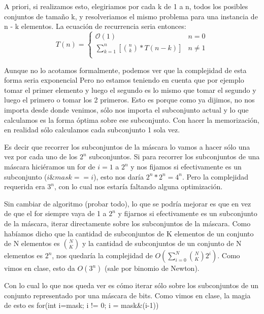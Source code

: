 A priori, si realizamos esto, elegiriamos por cada k de 1 a n, todos los posibles conjuntos de tamaño k, y resolveriamos el mismo problema para una instancia de n - k elementos.
La ecuación de recurrencia seria entonces:
\[ T(n) =  \begin{cases} 
      \mathcal{O}(1) & n = 0 \\
      \sum_{k=1}^{n} [ {n \choose k} * T(n - k)] & n \neq 1 \\ 
   \end{cases}
 \]

Aunque no lo acotamos formalmente, podemos ver que la complejidad de esta forma seria exponencial
Pero no estamos teniendo en cuenta que por ejemplo tomar el primer elemento y luego el segundo es lo mismo que tomar el segundo y luego el primero o tomar los 2 primeros. Esto es porque como ya dijimos, no nos importa desde donde venimos, sólo nos importa el subconjunto actual y lo que calculamos es la forma óptima sobre ese subconjunto. Con hacer la memorización, en realidad sólo calculamos cada subconjunto 1 sola vez. \newline


Es decir que recorrer los subconjuntos de la máscara lo vamos a hacer sólo una vez por cada uno de los $2^{n}$ subconjuntos. Si para recorrer los subconjuntos de una máscara hiciéramos un for de $i = 1$ a $2^{n}$ y nos fijamos si efectivamente es un subconjunto ($i \& mask == i$), esto nos daría $2^{n} * 2^{n} = 4^{n}$. Pero la complejidad requerida era $3^{n}$, con lo cual nos estaría faltando alguna optimización. \newline


Sin cambiar de algoritmo (probar todo), lo que se podría mejorar es que en vez de que el for siempre vaya de 1 a $2^{n}$ y fijarnos si efectivamente es un subconjunto de la máscara, iterar directamente sobre los subconjuntos de la máscara. Como habíamos dicho que la cantidad de subconjuntos de K elementos de un conjunto de N elementos es $\binom{N}{K}$ y la cantidad de subconjuntos de un conjunto de N elementos es $2^{n}$, nos quedaría la complejidad de $O(\sum_{i=0}^{N} \binom{N}{K} 2^{i} )$. Como vimos en clase, esto da $O(3^{n})$ (sale por binomio de Newton). \newline

Con lo cual lo que nos queda ver es cómo iterar sólo sobre los subconjuntos de un conjunto representado por una máscara de bits. Como vimos en clase, la magia de esto es  \newline for(int i=mask; i != 0; i = mask\&(i-1))  \newline

